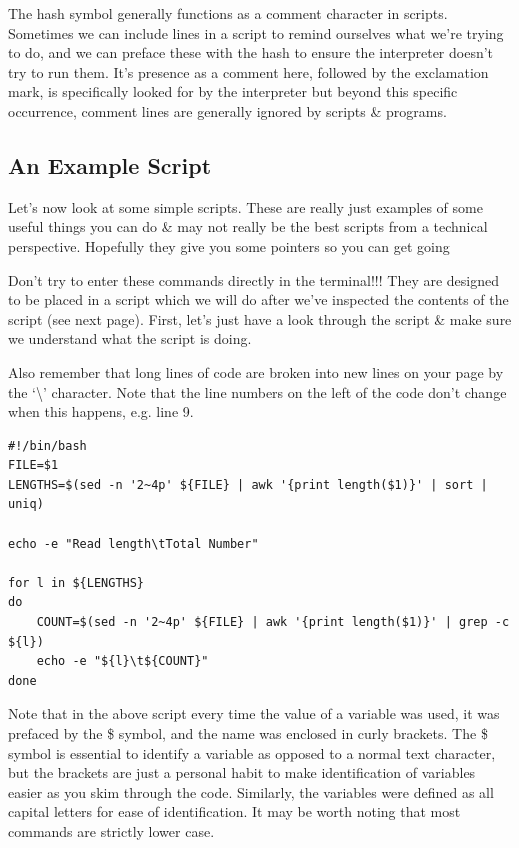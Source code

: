 \documentclass[a4paper,12pt,twoside]{memoir}
\begin{document}
\begin{note}
The hash symbol generally functions as a comment character in scripts.
Sometimes we can include lines in a script to remind ourselves what we're trying to do, and we can preface these with the hash to ensure the interpreter doesn't try to run them.
It's presence as a comment here, followed by the exclamation mark, is specifically looked for by the interpreter but beyond this specific occurrence, comment lines are generally ignored by scripts \& programs.
\end{note}

\subsection{An Example Script}
Let's now look at some simple scripts.
These are really just examples of some useful things you can do \& may not really be the best scripts from a technical perspective.
Hopefully they give you some pointers so you can get going

\clearpage
\begin{warning}
Don't try to enter these commands directly in the terminal!!!
They are designed to be placed in a script which we will do after we've inspected the contents of the script (see next page).
First, let's just have a look through the script \& make sure we understand what the script is doing.

Also remember that long lines of code are broken into new lines on your page by the `\textbackslash ' character.
Note that the line numbers on the left of the code don't change when this happens, e.g. line 9.
\end{warning}

\begin{lstlisting}
#!/bin/bash
FILE=$1
LENGTHS=$(sed -n '2~4p' ${FILE} | awk '{print length($1)}' | sort | uniq)

echo -e "Read length\tTotal Number"

for l in ${LENGTHS}
do
	COUNT=$(sed -n '2~4p' ${FILE} | awk '{print length($1)}' | grep -c ${l})
	echo -e "${l}\t${COUNT}" 
done
\end{lstlisting}

\begin{information}
Note that in the above script every time the value of a variable was used, it was prefaced by the \$ symbol, and the name was enclosed in curly brackets.
The \$ symbol is essential to identify a variable as opposed to a normal text character, but the brackets are just a personal habit to make identification of variables easier as you skim through the code.
Similarly, the variables were defined as all capital letters for ease of identification.
It may be worth noting that most commands are strictly lower case.
\end{information}
\end{document}
